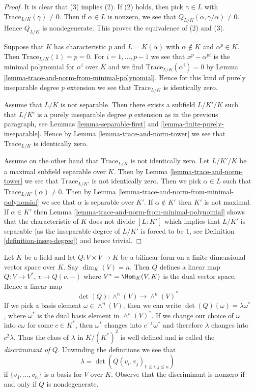 \begin{proof}
It is clear that (3) implies (2). If (2) holds, then pick $\gamma \in L$
with $\text{Trace}_{L/K}(\gamma) \not = 0$. Then if $\alpha \in L$
is nonzero, we see that $Q_{L/K}(\alpha, \gamma/\alpha) \not = 0$.
Hence $Q_{L/K}$ is nondegenerate. This proves the equivalence of
(2) and (3).

\medskip\noindent
Suppose that $K$ has characteristic $p$ and $L = K(\alpha)$ with
$\alpha \not \in K$ and $\alpha^p \in K$. Then $\text{Trace}_{L/K}(1) = p = 0$.
For $i = 1, \ldots, p - 1$ we see that $x^p - \alpha^{pi}$ is the minimal
polynomial for $\alpha^i$ over $K$ and we find
$\text{Trace}_{L/K}(\alpha^i) = 0$ by
Lemma \ref{lemma-trace-and-norm-from-minimal-polynomial}.
Hence for this kind of purely inseparable degree $p$ extension
we see that $\text{Trace}_{L/K}$ is identically zero.

\medskip\noindent
Assume that $L/K$ is not separable. Then there exists a subfield
$L/K'/K$ such that $L/K'$ is a purely inseparable degree $p$ extension
as in the previous paragraph, see
Lemmas \ref{lemma-separable-first} and \ref{lemma-finite-purely-inseparable}.
Hence by Lemma \ref{lemma-trace-and-norm-tower}
we see that $\text{Trace}_{L/K}$ is identically zero.

\medskip\noindent
Assume on the other hand that $\text{Trace}_{L/K}$ is not identically zero.
Let $L/K'/K$ be a maximal subfield separable over $K$. Then by
Lemma \ref{lemma-trace-and-norm-tower}
we see that $\text{Trace}_{L/K'}$ is not identically zero.
Then we pick $\alpha \in L$ such that
$\text{Trace}_{L/K'}(\alpha) \not = 0$.
Then by Lemma \ref{lemma-trace-and-norm-from-minimal-polynomial}
we see that $\alpha$ is separable over $K'$. If $\alpha \not \in K'$
then $K'$ is not maximal. If $\alpha \in K'$ then
Lemma \ref{lemma-trace-and-norm-from-minimal-polynomial}
shows that the characteristic of $K$ does not divide $[L : K']$
which implies that $L/K'$ is separable
(as the inseparable degree of $L/K'$ is forced to be $1$,
see Definition \ref{definition-insep-degree})
and hence trivial.
\end{proof}

\noindent
Let $K$ be a field and let $Q : V \times V \to K$ be a bilinear form
on a finite dimensional vector space over $K$. Say $\dim_K(V) = n$.
Then $Q$ defines a linear map $Q : V \to V^*$, $v \mapsto Q(v, -)$
where $V^* = \Hom_K(V, K)$ is the dual vector space. Hence a linear map
$$
\det(Q) : \wedge^n(V) \longrightarrow \wedge^n(V)^*
$$
If we pick a basis element $\omega \in \wedge^n(V)$, then we can
write $\det(Q)(\omega) = \lambda \omega^*$, where $\omega^*$
is the dual basis element in $\wedge^n(V)^*$. If we change our
choice of $\omega$ into $c \omega$ for some $c \in K^*$, then
$\omega^*$ changes into $c^{-1} \omega^*$ and therefore
$\lambda$ changes into $c^2 \lambda$. Thus the class of
$\lambda$ in $K/(K^*)^2$ is well defined and is called the
{\it discriminant of $Q$}. Unwinding the definitions we see that
$$
\lambda = \det(Q(v_i, v_j)_{1 \leq i, j \leq n})
$$
if $\{v_1, \ldots, v_n\}$ is a basis for $V$ over $K$. Observe that
the discriminant is nonzero if and only if $Q$ is nondegenerate.

